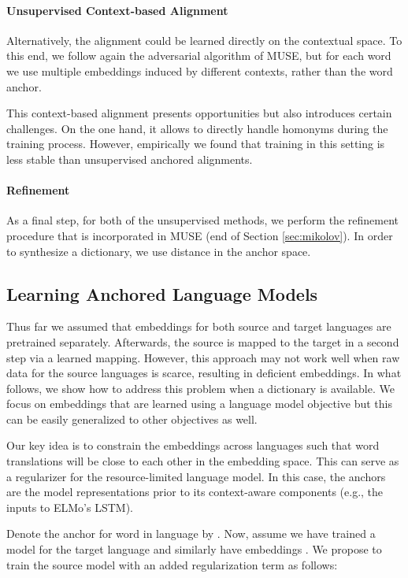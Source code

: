 \documentclass[11pt,a4paper]{article}
\newcommand{\secref}[1]{Section \ref{#1}}
\begin{document}
\paragraph{Unsupervised Context-based Alignment}
Alternatively, the alignment could be learned directly on the contextual space. To this end, we follow again the adversarial algorithm of MUSE, but for each word we use multiple embeddings induced by different contexts, rather than the word anchor.

This context-based alignment presents opportunities but also introduces certain challenges. 
On the one hand, it allows to directly handle homonyms during the training process. However, empirically we found that training in this setting is less stable than unsupervised anchored alignments.

\paragraph{Refinement}
As a final step, for both of the unsupervised methods, we perform the refinement procedure that is incorporated in MUSE (end of \secref{sec:mikolov}). In order to synthesize a dictionary, we use distance in the anchor space.


\subsection{Learning Anchored Language Models} \label{sec:anchored_lm}
Thus far we assumed that embeddings for both source and target languages are pretrained separately. Afterwards, the source is mapped to the target in a second step via a learned mapping. However, this approach may not work well when raw data for the source languages is scarce, resulting in deficient embeddings. In what follows, we show how to address this problem when a dictionary is available. We focus on embeddings that are learned using a language model objective but this can be easily generalized to other objectives as well.

Our key idea is to constrain the embeddings across languages such that word translations will be close to each other in the embedding space.  This can serve as a regularizer for the resource-limited language model. In this case, the anchors are the model representations prior to its context-aware components (e.g., the inputs to ELMo's LSTM). 





Denote the anchor for word  in language  by . Now, assume we have trained a model for the target language and similarly have embeddings  . We propose to train the source model with an added regularization term as follows:
\end{document}
